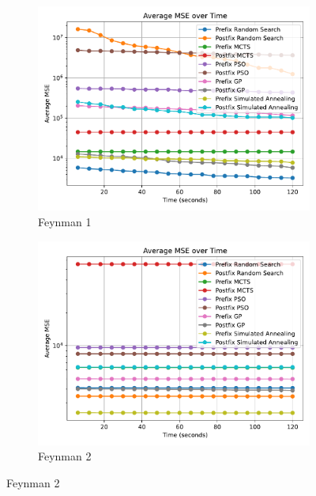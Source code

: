 \documentclass[runningheads]{llncs}
\begin{document}
\begin{figure}
    \centering
    
    \begin{subfigure}[b]{0.4\textwidth}
        \includegraphics[width=\linewidth, keepaspectratio]{AIFeynman_Benchmarks/Feynman_Benchmark_1.pdf}
        \caption{Feynman 1}
        \label{subfig:feynman_1}
    \end{subfigure}
    \begin{subfigure}[b]{0.4\textwidth}
        \includegraphics[width=\linewidth, keepaspectratio]{AIFeynman_Benchmarks/Feynman_Benchmark_2.pdf}
        \caption{Feynman 2}
        \label{subfig:feynman_2}
    \end{subfigure}
    

\end{figure}
\end{document}
